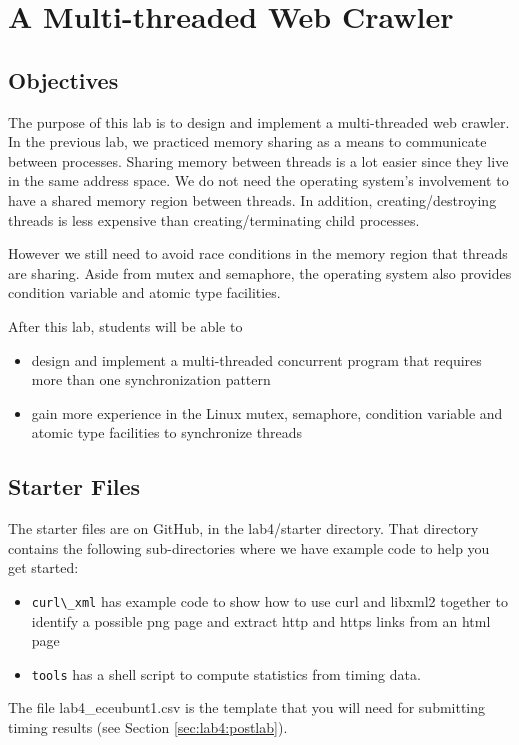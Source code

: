 \chapter{A Multi-threaded Web Crawler}

\section{Objectives}
The purpose of this lab is to design and implement a multi-threaded web crawler. In the previous lab, we practiced memory sharing as a means to communicate between processes. Sharing memory between threads is a lot easier since they live in the same address space. We do not need the operating system's involvement to have a shared memory region between threads. In addition, creating/destroying threads is less expensive than creating/terminating child processes. 

However we still need to avoid race conditions in the memory region that threads are sharing. Aside from mutex and semaphore, the operating system also provides condition variable and atomic type facilities. 

After this lab, students will be able to
\begin{itemize}
\item design and implement a multi-threaded concurrent program that requires more than one synchronization pattern
\item gain more experience in the Linux mutex, semaphore, condition variable and atomic type facilities to synchronize threads
\end{itemize}

\section{Starter Files}
The starter files are on GitHub, in the lab4/starter directory. That directory contains the following sub-directories where we have example code to help you get started:

\begin{itemize}
\item \verb+curl\_xml+ has example code to show how to use curl and libxml2 together to identify a possible png page and extract http and https links from an html page
\item \verb+tools+ has a shell script to compute statistics from timing data.
\end{itemize}
The file lab4\_eceubunt1.csv is the template that you will need for submitting timing results (see Section \ref{sec:lab4:postlab}).

